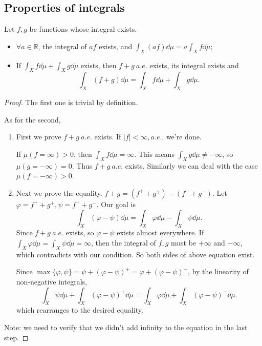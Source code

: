 \subsection{Properties of integrals}
\label{sub:Properties of integrals}
\begin{theorem}
    Let $f,g$ be functions whose integral exists.
	\begin{itemize}
		\item $\forall a\in \mathbb{R}$, the integral of $af$ exists,
			and $\int_X (af)\dd \mu = a\int_X f\dd \mu$;
		\item If $\int_X f\dd \mu + \int_X g\dd \mu$ exists,
			then $f + g\ a.e.$ exists, its integral exists and
			\[
			\int_X(f+g)\dd \mu = \int_X f\dd \mu + \int_X g\dd \mu.
			\]
	\end{itemize}
\end{theorem}
\begin{proof}[Proof]
    The first one is trivial by definition.

	As for the second,
	\begin{enumerate}
		\item First we prove $f+g \ a.e.$ exists.
			If $|f|<\infty, a.e.$, we're done.

			If $\mu(f = \infty) > 0$, then $\int_X f\dd \mu = \infty$.
			This means $\int_X g\dd \mu \ne -\infty$, so $\mu(g = - \infty) = 0$.
			Thus $f + g\ a.e.$ exists.
			Similarly we can deal with the case $\mu(f = -\infty) > 0$.
		\item Next we prove the equality.
			$f + g = (f^+ + g^+) - (f^- + g^-)$.
			Let $\varphi = f^+ + g^+, \psi = f^- + g^-$.
			Our goal is
			\[
			\int_X (\varphi - \psi)\dd \mu = \int_X \varphi\dd \mu - \int_X \psi\dd \mu.
			\]
			Since $f+g \ a.e.$ exists, so $\varphi - \psi$ exists almost everywhere.
			If $\int_X \varphi \dd\mu = \int_X \psi\dd \mu = \infty$,
			then the integral of $f,g$ must be $+\infty$ and $-\infty$,
			which contradicts with our condition.
			So both sides of above equation exist.

			Since $\max\{\varphi, \psi\} = \psi + (\varphi - \psi)^+
			= \varphi + (\varphi - \psi)^-$, by the linearity of non-negative integrals,
			\[
			\int_X \psi\dd \mu + \int_X (\varphi - \psi)^+\dd \mu
			= \int_X \varphi\dd \mu + \int_X (\varphi - \psi)^-\dd \mu.
			\]
			which rearranges to the desired equality.
	\end{enumerate}
	Note: we need to verify that we didn't add infinity to the equation in the last step.
\end{proof}

